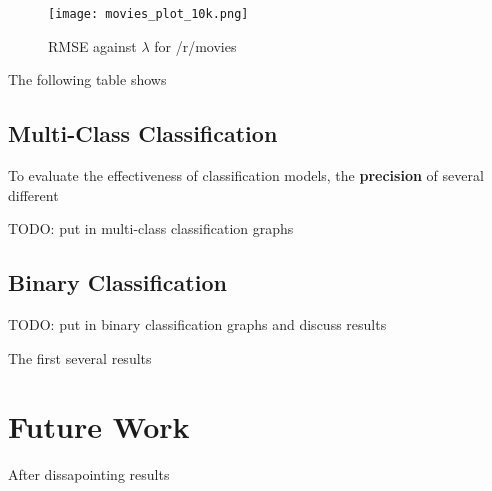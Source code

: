\documentclass[11pt, twocolumn]{article}
\begin{document}
	\begin{figure}[h!]
	\centering
	\texttt{[image: movies\_plot\_10k.png]}
	\label{movies_plot_10k}
	\caption{RMSE against $\lambda$ for /r/movies}
	\end{figure}
	
	The following table shows 
	
	\subsection{Multi-Class Classification}
	To evaluate the effectiveness of classification models, the \textbf{precision} of several different 
	
	TODO: put in multi-class classification graphs
	
	\subsection{Binary Classification}
	
	TODO: put in binary classification graphs and discuss results

	The first several results 

\section{Future Work}
	
	After dissapointing results 




\end{document}
